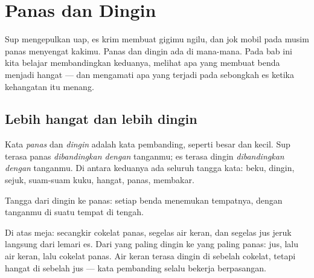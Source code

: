 \chapter{Panas dan Dingin}\label{ch:g1:hot-and-cold}

Sup mengepulkan uap, es krim membuat gigimu ngilu, dan jok mobil pada
musim panas menyengat kakimu. Panas dan dingin ada di mana-mana. Pada
bab ini kita belajar membandingkan keduanya, melihat apa yang membuat
benda menjadi hangat --- dan mengamati apa yang terjadi pada sebongkah
es ketika kehangatan itu menang.

\section{Lebih hangat dan lebih dingin}

\begin{definition}\label{def:g1:hot-and-cold:words}
Kata \emph{panas} dan \emph{dingin} adalah
kata pembanding, seperti besar dan kecil. Sup terasa panas
\emph{dibandingkan dengan} tanganmu; es terasa dingin
\emph{dibandingkan dengan} tanganmu. Di antara keduanya ada seluruh
tangga kata: beku, dingin, sejuk, suam-suam kuku, hangat, panas,
membakar.
\end{definition}

\begin{omfigure}

{\small Tangga dari dingin ke panas: setiap benda menemukan tempatnya,
dengan tanganmu di suatu tempat di tengah.}
\end{omfigure}

\begin{example}\label{ex:g1:hot-and-cold:drinks}
Di atas meja: secangkir cokelat panas, segelas air keran, dan segelas
jus jeruk langsung dari lemari es. Dari yang paling dingin ke yang
paling panas: jus, lalu air keran, lalu cokelat panas. Air keran
terasa dingin di sebelah cokelat, tetapi hangat di sebelah jus ---
kata pembanding selalu bekerja berpasangan.
\end{example}

